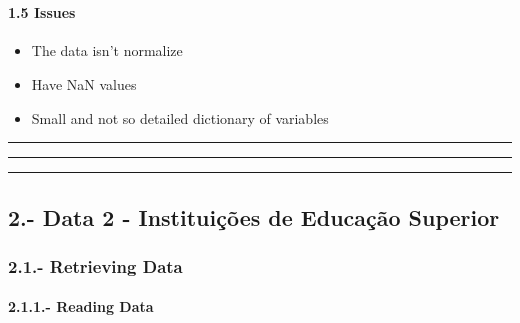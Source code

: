 \documentclass[11pt]{article}
\providecommand{\tightlist}{%
      \setlength{\itemsep}{0pt}\setlength{\parskip}{0pt}}
\begin{document}
    \begin{center}
    \end{center}
    { \hspace*{\fill} \\}
    
    \paragraph{1.5 Issues}\label{issues}

\begin{itemize}
\tightlist
\item
  The data isn't normalize
\item
  Have NaN values
\item
  Small and not so detailed dictionary of variables
\end{itemize}

    \begin{center}\rule{0.5\linewidth}{\linethickness}\end{center}

\begin{center}\rule{0.5\linewidth}{\linethickness}\end{center}

\begin{center}\rule{0.5\linewidth}{\linethickness}\end{center}

    \subsection{2.- Data 2 - Instituições de Educação
Superior}\label{data-2---instituiuxe7uxf5es-de-educauxe7uxe3o-superior}

    \subsubsection{2.1.- Retrieving Data}\label{retrieving-data}

    \paragraph{2.1.1.- Reading Data}\label{reading-data}
\end{document}
